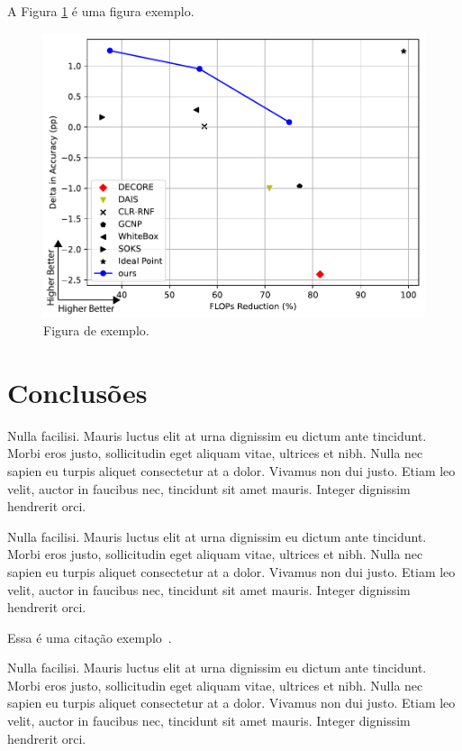 \documentclass[a4paper,10pt,twocolumn]{article}
\begin{document}
A Figura \ref*{fig:sample_figure} é uma figura exemplo.

\begin{figure}[htbp]
    \centering
    \includegraphics[width=\linewidth]{Figures/sample_figure.pdf}
    \caption{Figura de exemplo.}
    \label{fig:sample_figure}
\end{figure}

\section*{Conclusões}

Nulla facilisi. Mauris luctus elit at urna dignissim eu dictum ante tincidunt. Morbi eros justo, sollicitudin eget aliquam vitae, ultrices et nibh. Nulla nec sapien eu turpis aliquet consectetur at a dolor. Vivamus non dui justo. Etiam leo velit, auctor in faucibus nec, tincidunt sit amet mauris. Integer dignissim hendrerit orci.

Nulla facilisi. Mauris luctus elit at urna dignissim eu dictum ante tincidunt. Morbi eros justo, sollicitudin eget aliquam vitae, ultrices et nibh. Nulla nec sapien eu turpis aliquet consectetur at a dolor. Vivamus non dui justo. Etiam leo velit, auctor in faucibus nec, tincidunt sit amet mauris. Integer dignissim hendrerit orci.

Essa é uma citação exemplo~\cite{example1, example2}.

Nulla facilisi. Mauris luctus elit at urna dignissim eu dictum ante tincidunt. Morbi eros justo, sollicitudin eget aliquam vitae, ultrices et nibh. Nulla nec sapien eu turpis aliquet consectetur at a dolor. Vivamus non dui justo. Etiam leo velit, auctor in faucibus nec, tincidunt sit amet mauris. Integer dignissim hendrerit orci.
\end{document}
